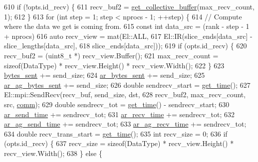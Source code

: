 \begin{DoxyCode}
610   \textcolor{keywordflow}{if} (!opts.id\_recv) \{
611     recv\_buf2 = \hyperlink{classlbann_1_1lbann__comm_ae925ac5eaf2895717c709b252961b3bf}{get\_collective\_buffer}(max\_recv\_count, 1);
612   \}
613   \textcolor{keywordflow}{for} (\textcolor{keywordtype}{int} step = 1; step < nprocs - 1; ++step) \{
614     \textcolor{comment}{// Compute where the data we get is coming from.}
615     \textcolor{keyword}{const} \textcolor{keywordtype}{int} data\_src = (rank - step - 1 + nprocs) %
616     \textcolor{keyword}{auto} recv\_view = mat(El::ALL,
617                          El::IR(slice\_ends[data\_src] - slice\_lengths[data\_src],
618                                 slice\_ends[data\_src]));
619     \textcolor{keywordflow}{if} (opts.id\_recv) \{
620       recv\_buf2 = (uint8\_t *) recv\_view.Buffer();
621       max\_recv\_count = \textcolor{keyword}{sizeof}(DataType) * recv\_view.Height() * recv\_view.Width();
622     \}
623     \hyperlink{classlbann_1_1lbann__comm_ad1f146ae7337ece6266fd307944928e0}{bytes\_sent} += send\_size;
624     \hyperlink{classlbann_1_1lbann__comm_aa520c16eafde742b70daf60866afc6a8}{ar\_bytes\_sent} += send\_size;
625     \hyperlink{classlbann_1_1lbann__comm_a2cfe1264a83865360692c48d7869fe67}{ar\_ag\_bytes\_sent} += send\_size;
626     \textcolor{keywordtype}{double} sendrecv\_start = \hyperlink{namespacelbann_a478d36031ff0659893c4322cd856157f}{get\_time}();
627     El::mpi::SendRecv(recv\_buf, send\_size, dst,
628                       recv\_buf2, max\_recv\_count, src, \hyperlink{file__io_8cpp_ab048c6f9fcbcfaa57ce68b00263dbebe}{comm});
629     \textcolor{keywordtype}{double} sendrecv\_tot = \hyperlink{namespacelbann_a478d36031ff0659893c4322cd856157f}{get\_time}() - sendrecv\_start;
630     \hyperlink{classlbann_1_1lbann__comm_a60a664f47efb52d9936b72d34059d1ef}{ar\_send\_time} += sendrecv\_tot;
631     \hyperlink{classlbann_1_1lbann__comm_a4c9323938961c3524dc67f4b7b47e3ae}{ar\_recv\_time} += sendrecv\_tot;
632     \hyperlink{classlbann_1_1lbann__comm_a64cb0b86e9368c1d83370ba6cb0083ba}{ar\_ag\_send\_time} += sendrecv\_tot;
633     \hyperlink{classlbann_1_1lbann__comm_a1896c3ecd1d5b084497c6ed47c1c9bae}{ar\_ag\_recv\_time} += sendrecv\_tot;
634     \textcolor{keywordtype}{double} recv\_trans\_start = \hyperlink{namespacelbann_a478d36031ff0659893c4322cd856157f}{get\_time}();
635     \textcolor{keywordtype}{int} recv\_size = 0;
636     \textcolor{keywordflow}{if} (opts.id\_recv) \{
637       recv\_size = \textcolor{keyword}{sizeof}(DataType) * recv\_view.Height() * recv\_view.Width();
638     \} \textcolor{keywordflow}{else} \{

\end{DoxyCode}
